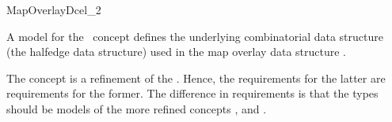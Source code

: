 
\ccRefPageBegin


\begin{ccRefConcept}{MapOverlayDcel_2}

   A model for the \ccRefName\ concept defines the underlying
   combinatorial data structure (the halfedge data structure) used in the
   map overlay data structure .


The
\lcTex{\ccc{\ccRefName}}\lcHtml{\ccRefName}
concept is a refinement of the . 
Hence, the requirements for the latter are requirements for the former. 
The difference in requirements is that the  
types should be models of the more refined concepts 
,  and .

\ccTypes

    

\end{ccRefConcept} %
\ccRefPageEnd
